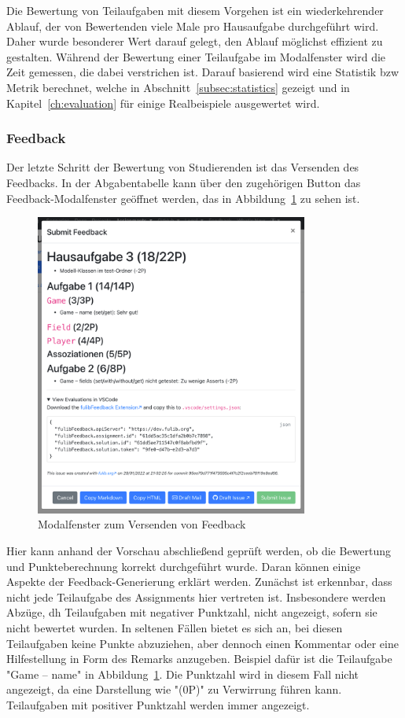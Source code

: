 Die Bewertung von Teilaufgaben mit diesem Vorgehen ist ein wiederkehrender Ablauf, der von Bewertenden viele Male pro Hausaufgabe durchgeführt wird.
Daher wurde besonderer Wert darauf gelegt, den Ablauf möglichst effizient zu gestalten.
Während der Bewertung einer Teilaufgabe im Modalfenster wird die Zeit gemessen, die dabei verstrichen ist.
Darauf basierend wird eine Statistik \ac{bzw} Metrik berechnet, welche in Abschnitt~\ref{subsec:statistics} gezeigt und in Kapitel~\ref{ch:evaluation} für einige Realbeispiele ausgewertet wird.

\subsubsection{Feedback}

Der letzte Schritt der Bewertung von Studierenden ist das Versenden des Feedbacks.
In der Abgabentabelle kann über den zugehörigen Button das Feedback-Modalfenster geöffnet werden, das in Abbildung~\ref{fig:submit-feedback} zu sehen ist.

\begin{figure}
    \centering
    \includegraphics[width=0.8\textwidth]{images/submit-feedback}
    \caption{Modalfenster zum Versenden von Feedback}
    \label{fig:submit-feedback}
\end{figure}

Hier kann anhand der Vorschau abschließend geprüft werden, ob die Bewertung und Punkteberechnung korrekt durchgeführt wurde.
Daran können einige Aspekte der Feedback-Generierung erklärt werden.
Zunächst ist erkennbar, dass nicht jede Teilaufgabe des Assignments hier vertreten ist.
Insbesondere werden Abzüge, \ac{dh} Teilaufgaben mit negativer Punktzahl, nicht angezeigt, sofern sie nicht bewertet wurden.
In seltenen Fällen bietet es sich an, bei diesen Teilaufgaben keine Punkte abzuziehen, aber dennoch einen Kommentar oder eine Hilfestellung in Form des Remarks anzugeben.
Beispiel dafür ist die Teilaufgabe "Game -- name" in Abbildung~\ref{fig:submit-feedback}.
Die Punktzahl wird in diesem Fall nicht angezeigt, da eine Darstellung wie "(0P)" zu Verwirrung führen kann.
Teilaufgaben mit positiver Punktzahl werden immer angezeigt.

